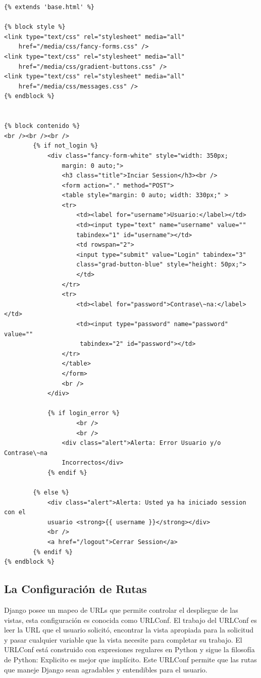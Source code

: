\begin{lstlisting}[style=HTML]
{% extends 'base.html' %}

{% block style %}
<link type="text/css" rel="stylesheet" media="all"
    href="/media/css/fancy-forms.css" />
<link type="text/css" rel="stylesheet" media="all"
    href="/media/css/gradient-buttons.css" />
<link type="text/css" rel="stylesheet" media="all"
    href="/media/css/messages.css" />
{% endblock %}


{% block contenido %}
<br /><br /><br />
        {% if not_login %}
            <div class="fancy-form-white" style="width: 350px;
                margin: 0 auto;">
                <h3 class="title">Inciar Session</h3><br />
                <form action="." method="POST">
                <table style="margin: 0 auto; width: 330px;" >
                <tr>
                    <td><label for="username">Usuario:</label></td>
                    <td><input type="text" name="username" value=""
                    tabindex="1" id="username"></td>
                    <td rowspan="2">
                    <input type="submit" value="Login" tabindex="3"
                    class="grad-button-blue" style="height: 50px;">
                    </td>
                </tr>
                <tr>
                    <td><label for="password">Contrase\~na:</label></td>
                    <td><input type="password" name="password" value=""
                     tabindex="2" id="password"></td>
                </tr>
                </table>
                </form>
                <br />
            </div>

            {% if login_error %}
                    <br />
                    <br />
                <div class="alert">Alerta: Error Usuario y/o Contrase\~na
                Incorrectos</div>
            {% endif %}

        {% else %}
            <div class="alert">Alerta: Usted ya ha iniciado session con el
            usuario <strong>{{ username }}</strong></div>
            <br />
            <a href="/logout">Cerrar Session</a>
        {% endif %}
{% endblock %}
\end{lstlisting}

\vspace{0.1cm}

\subsection{La Configuración de Rutas}

Django posee un mapeo de URLs que permite controlar el despliegue de las vistas, esta configuración es conocida como URLConf. El trabajo del URLConf es leer la URL que el usuario solicitó, encontrar la vista apropiada para la solicitud y pasar cualquier variable que la vista necesite para completar su trabajo. El
URLConf está construido con expresiones regulares en Python y sigue la filosofía de Python: Explicito es mejor que implí­cito. Este URLConf permite que las rutas que maneje Django sean agradables y entendibles para el usuario.\\[0.1cm]

